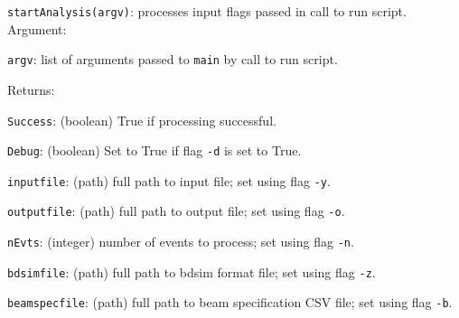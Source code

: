 \begin{description}
  \item{\texttt{startAnalysis(argv)}}: processes input flags passed
    in call to run script.  \\
    Argument:
    \begin{description}
      \item{\texttt{argv}}: list of arguments passed to \texttt{main}
        by call to run script.
    \end{description}
    Returns:
    \begin{description}
      \item{\texttt{Success}}:      (boolean) True if processing successful.
      \item{\texttt{Debug}}:        (boolean) Set to True if
                                    flag \texttt{-d} is set to True.
      \item{\texttt{inputfile}}:    (path) full path to input file; set
                                    using flag \texttt{-y}.
      \item{\texttt{outputfile}}:   (path) full path to output file; set
                                    using flag \texttt{-o}.
      \item{\texttt{nEvts}}:        (integer) number of events to
                                    process; set using flag \texttt{-n}.
      \item{\texttt{bdsimfile}}:    (path) full path to bdsim format file; set
                                    using flag \texttt{-z}.
      \item{\texttt{beamspecfile}}: (path) full path to beam
                                    specification CSV file; set
                                    using flag \texttt{-b}. \\
    \end{description}
    

\end{description}
